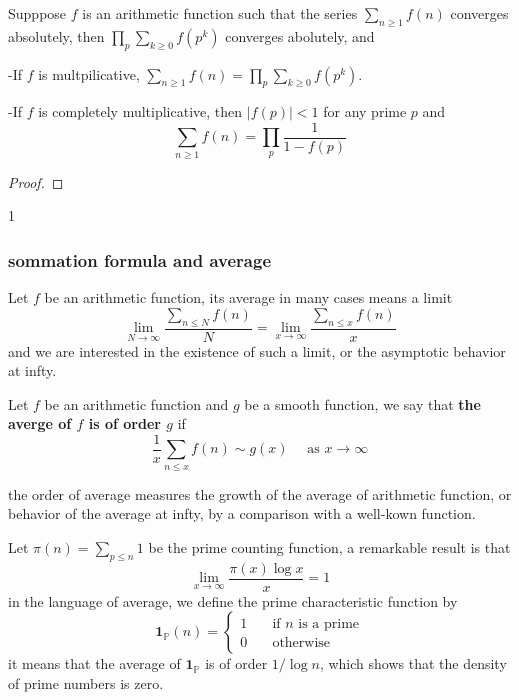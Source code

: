 \begin{proposition}
    Supppose \(f\) is an arithmetic function such that the series \(\sum_{n \geq 1} f(n)\) converges absolutely, then \(\prod_{p} \sum_{k \geq 0}f(p^k)\) converges abolutely, and

    -If \(f\) is multpilicative,  \(\sum_{n \geq 1} f(n) =  \prod_{p}\sum_{k \geq 0} f(p^k)\).

    -If \(f\) is completely multiplicative, then \(|f(p)| < 1\) for any prime \(p\) and 
    \[\sum_{n \geq 1} f(n) = \prod_{p} \frac{1}{1-f(p)}\]
    
\end{proposition}

\begin{proof}
    
\end{proof}1


\subsubsection{sommation formula and average}
Let \(f\) be an arithmetic function, its average in many cases means a limit
\[\lim_{N \rightarrow \infty} \frac{\sum_{n \leq N} f(n)}{N} = \lim_{x \rightarrow \infty} \frac{\sum_{n \leq x}f(n)}{x}\]
and we are interested in the existence of such a limit, or the asymptotic behavior at infty.

\begin{definition}
    Let \(f\) be an arithmetic function and \(g\) be a smooth function, we say that \textbf{the averge of \(f\) is of order \(g\)} if 
    \[
    \frac{1}{x}\sum_{n \leq x} f(n) \sim g(x) \quad \text{ as } x \to \infty\]
\end{definition}

the order of average measures the growth of the average of arithmetic function, or behavior of the average at infty, by a comparison with a well-kown function.

\begin{example}
    Let \(\pi(n) = \sum_{p \leq n}1 \) be the prime counting function, a remarkable result is that
    \[\lim_{x \rightarrow \infty} \frac{\pi(x) \log x}{ x}  = 1\]
    in the language of average, we define the prime characteristic function by
    \[\mathbf{1}_{\mathbb{P}}(n) = \begin{cases}
    1 \quad &\text{if } n \text{ is a prime}\\
    0 \quad &\text{otherwise}
    \end{cases}\]
    it means that the average of \(\mathbf{1}_{\mathbb{P}}\) is of order \(1/\log n\), which shows that the density of prime numbers is zero.
\end{example}


